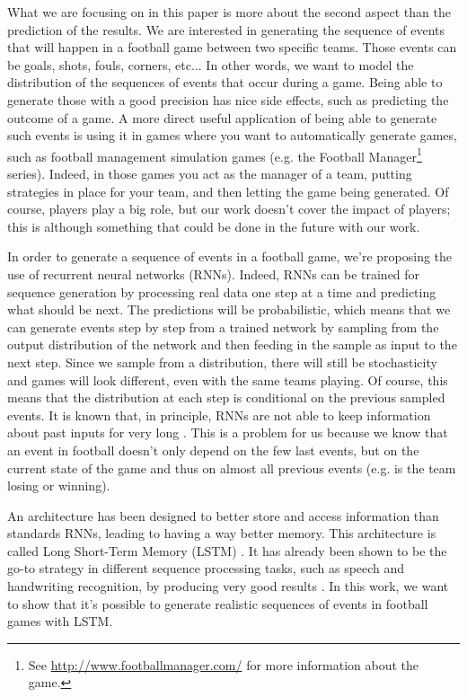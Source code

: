 \documentclass[10pt,conference,onecolumn]{IEEEtran}
\begin{document}
What we are focusing on in this paper is more about the second aspect than the prediction of the results. We are interested in generating the sequence of events that will happen in a football game between two specific teams. Those events can be goals, shots, fouls, corners, etc... In other words, we want to model the distribution of the sequences of events that occur during a game. Being able to generate those with a good precision has nice side effects, such as predicting the outcome of a game. A more direct useful application of being able to generate such events is using it in games where you want to automatically generate games, such as football management simulation games (e.g. the Football Manager\footnote{See \url{http://www.footballmanager.com/} for more information about the game.} series). Indeed, in those games you act as the manager of a team, putting strategies in place for your team, and then letting the game being generated. Of course, players play a big role, but our work doesn't cover the impact of players; this is although something that could be done in the future with our work.

In order to generate a sequence of events in a football game, we're proposing the use of recurrent neural networks (RNNs). Indeed, RNNs can be trained for sequence generation by processing real data one step at a time and predicting what should be next. The predictions will be probabilistic, which means that we can generate events step by step from a trained network by sampling from the output distribution of the network and then feeding in the sample as input to the next step. Since we sample from a distribution, there will still be stochasticity and games will look different, even with the same teams playing. Of course, this means that the distribution at each step is conditional on the previous sampled events. It is known that, in principle, RNNs are not able to keep information about past inputs for very long \cite{Hochreiter01gradientflow}. This is a problem for us because we know that an event in football doesn't only depend on the few last events, but on the current state of the game and thus on almost all previous events (e.g. is the team losing or winning).

An architecture has been designed to better store and access information than standards RNNs, leading to having a way better memory. This architecture is called Long Short-Term Memory (LSTM) \cite{lstm}. It has already been shown to be the go-to strategy in different sequence processing tasks, such as speech and handwriting recognition, by producing very good results \cite{speech_recognition, NIPS2008/handwriting_recognition}. In this work, we want to show that it's possible to generate realistic sequences of events in football games with LSTM.
\end{document}

